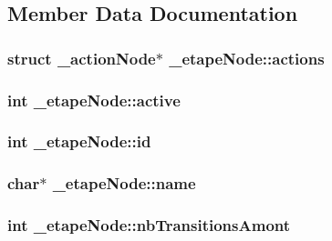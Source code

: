 \subsection{Member Data Documentation}
\subsubsection[{\texorpdfstring{actions}{actions}}]{\setlength{\rightskip}{0pt plus 5cm}struct {\bf \+\_\+action\+Node}$\ast$ \+\_\+etape\+Node\+::actions}\hypertarget{struct__etapeNode_a670ec666f56cc3216c5b454b1e2eb052}{}\label{struct__etapeNode_a670ec666f56cc3216c5b454b1e2eb052}
\subsubsection[{\texorpdfstring{active}{active}}]{\setlength{\rightskip}{0pt plus 5cm}int \+\_\+etape\+Node\+::active}\hypertarget{struct__etapeNode_ada91e4cad58bcdc1cc8343ba2f533d34}{}\label{struct__etapeNode_ada91e4cad58bcdc1cc8343ba2f533d34}
\subsubsection[{\texorpdfstring{id}{id}}]{\setlength{\rightskip}{0pt plus 5cm}int \+\_\+etape\+Node\+::id}\hypertarget{struct__etapeNode_a336427fefb9a6d41bf4561eac9d27d28}{}\label{struct__etapeNode_a336427fefb9a6d41bf4561eac9d27d28}
\subsubsection[{\texorpdfstring{name}{name}}]{\setlength{\rightskip}{0pt plus 5cm}char$\ast$ \+\_\+etape\+Node\+::name}\hypertarget{struct__etapeNode_a4ebe4f794f80b118f0432af7dada31fd}{}\label{struct__etapeNode_a4ebe4f794f80b118f0432af7dada31fd}
\subsubsection[{\texorpdfstring{nb\+Transitions\+Amont}{nbTransitionsAmont}}]{\setlength{\rightskip}{0pt plus 5cm}int \+\_\+etape\+Node\+::nb\+Transitions\+Amont}\hypertarget{struct__etapeNode_a8668c866d59c44f2a1fb06b12eceea9a}{}\label{struct__etapeNode_a8668c866d59c44f2a1fb06b12eceea9a}
